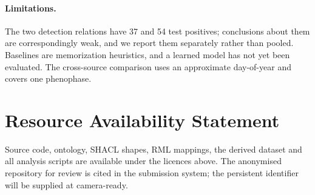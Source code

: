 \paragraph{Limitations.} The two detection relations have 37 and 54 test
positives; conclusions about them are correspondingly weak, and we report them
separately rather than pooled. Baselines are memorization heuristics, and a
learned model has not yet been evaluated. The cross-source comparison uses an
approximate day-of-year and covers one phenophase.

\section*{Resource Availability Statement}

Source code, ontology, SHACL shapes, RML mappings, the derived dataset and all
analysis scripts are available under the licences above. The anonymised
repository for review is cited in the submission system; the persistent
identifier will be supplied at camera-ready.

